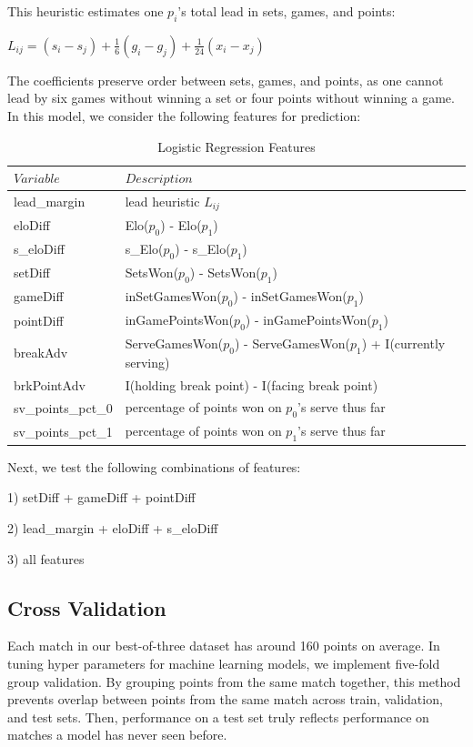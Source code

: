 \documentclass[chapterprefix=false]{report}
\begin{document}
This heuristic estimates one $p_i$'s total lead in sets, games, and points:

$L_{ij} = (s_i-s_j) + \frac{1}{6}(g_i-g_j) + \frac{1}{24}(x_i-x_j)$

The coefficients preserve order between sets, games, and points, as one cannot lead by six games without winning a set or four points without winning a game. In this model, we consider the following features for prediction:

\begin{table}[H]
\centering
\caption{Logistic Regression Features}
\label{my-label}
\begin{tabular}{ll}
 \hline
 $Variable$ & $Description$ \\
 \hline
 lead\_margin & lead heuristic $L_{ij}$ \\
 \hline
 eloDiff &  Elo($p_0$) - Elo($p_1$) \\
 \hline
  s\_eloDiff &  s\_Elo($p_0$) - s\_Elo($p_1$) \\
 \hline
 setDiff &  SetsWon($p_0$) - SetsWon($p_1$)\\
 \hline
 gameDiff &  inSetGamesWon($p_0$) - inSetGamesWon($p_1$)\\
 \hline
 pointDiff &  inGamePointsWon($p_0$) - inGamePointsWon($p_1$)\\
 \hline
  breakAdv &  ServeGamesWon($p_0$) - ServeGamesWon($p_1$) + I(currently serving)\\
 \hline
 brkPointAdv & I(holding break point) - I(facing break point)\\
 \hline
 sv\_points\_pct\_0 & percentage of points won on $p_0$'s serve thus far\\
 \hline
 sv\_points\_pct\_1 & percentage of points won on $p_1$'s serve thus far\\
 \hline
\end{tabular}
\end{table}

Next, we test the following combinations of features:

1) setDiff + gameDiff + pointDiff

2) lead\_margin + eloDiff + s\_eloDiff

3) all features

\subsection{Cross Validation}

Each match in our best-of-three dataset has around 160 points on average. In tuning hyper parameters for machine learning models, we implement five-fold group validation. By grouping points from the same match together, this method prevents overlap between points from the same match across train, validation, and test sets. Then, performance on a test set truly reflects performance on matches a model has never seen before. 
\end{document}
